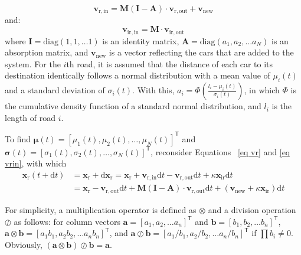 \documentclass[review,11pt,nonatbib]{elsarticle}
\begin{document}
\begin{equation}\label{eq vrin}
\mathbf{v}_{\mathrm{r,in}} = \mathbf{M}(\mathbf{I}-\mathbf{A})\cdot \mathbf{v}_{\mathrm{r,out}} + \mathbf{v}_{\mathrm{new}}
\end{equation}
and:
\begin{equation}\label{eq virin}
\mathbf{v}_{\mathrm{ir,in}} = \mathbf{M}\cdot \mathbf{v}_{\mathrm{ir,out}}
\end{equation}
where $\mathbf{I}=\mathrm{diag}(1,1,\ldots 1)$ is an identity matrix, $\mathbf{A}=\mathrm{diag}(a_1,a_2,\ldots a_N)$ is an absorption matrix, and $\mathbf{v}_{\mathrm{new}}$ is a vector reflecting the cars that are added to the system. For the $i$th road, it is assumed that the distance of each car to its destination identically follows a normal distribution with a mean value of $\mu_i(t)$ and a standard deviation of $\sigma_i(t)$. With this, $a_i=\Phi\left(\frac{l_i-\mu_i(t)}{\sigma_i(t)}\right)$, in which $\Phi$ is the cumulative density function of a standard normal distribution, and $l_i$ is the length of road $i$.
\par To find ${\bm{\mu}}(t)=[\mu_1(t),\mu_2(t),\ldots,\mu_N(t)]^{\mathsf{T}}$ and ${\bm{\sigma}}(t)=[\sigma_1(t),\sigma_2(t),\ldots,\sigma_N(t)]^{\mathsf{T}}$, reconsider Equations ~\eqref{eq vr} and \eqref{eq vrin}, with which
\begin{equation}\label{eq xr t+dt}
\begin{aligned}
\mathbf{x}_{\mathrm{r}}(t+\mathrm{d}t)
& = \mathbf{x}_{\mathrm{r}} + \mathrm{d} \mathbf{x}_{\mathrm{r}} = \mathbf{x}_{\mathrm{r}} + \mathbf{v}_{\mathrm{r,in}}\mathrm{d}t - \mathbf{v}_{\mathrm{r,out}}\mathrm{d}t + \kappa \mathbf{x}_{\mathrm{ir}}\mathrm{d}t  \\
&=  \mathbf{x}_{\mathrm{r}} - \mathbf{v}_{\mathrm{r,out}}\mathrm{d}t + \mathbf{M}(\mathbf{I}-\mathbf{A})\cdot \mathbf{v}_{\mathrm{r,out}}\mathrm{d}t + (\mathbf{v}_{\mathrm{new}} +\kappa \mathbf{x}_{\mathrm{ir}})\mathrm{d}t
\end{aligned}
\end{equation}
\par For simplicity, a multiplication operator is defined as $\otimes$ and a division operation $\oslash$ as follows: for column vectors $\mathbf{a}=[a_1,a_2,\ldots a_n]^{\mathsf{T}}$ and $\mathbf{b}=[b_1,b_2,\ldots b_n]^{\mathsf{T}}$, $\mathbf{a}\otimes\mathbf{b}=[a_1b_1,a_2b_2,\ldots a_nb_n]^{\mathsf{T}}$, and $\mathbf{a}\oslash\mathbf{b}=[a_1/b_1,a_2/b_2,\ldots a_n/b_n]^{\mathsf{T}}$ if $\prod b_i\neq 0$. Obviously, $(\mathbf{a}\otimes\mathbf{b})\oslash \mathbf{b}=\mathbf{a}$.
\end{document}
